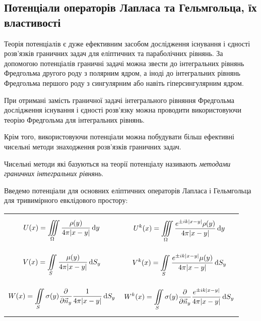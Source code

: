 \subsection{Потенціали операторів Лапласа та Гельмгольца, їх властивості}

Теорія потенціалів є дуже ефективним засобом дослідження існування і єдності розв'язків граничних задач для еліптичних та параболічних рівнянь. За допомогою потенціалів граничні задачі можна звести до інтегральних рівнянь Фредгольма другого роду з полярним ядром, а іноді до інтегральних рівнянь Фредгольма першого роду з сингулярним або навіть гіперсингулярним ядром. \medskip

При отримані замість граничної задачі інтегрального рівняння Фредгольма дослідження існування і єдності розв'язку можна проводити використовуючи теорію Фредгольма для інтегральних рівнянь. \medskip

Крім того, використовуючи потенціали можна побудувати більш ефективні чисельні методи знаходження розв'язків граничних задач.

\begin{definition}
	Чисельні методи які базуються на теорії потенціалу називають \textit{методами граничних інтегральних рівнянь}.
\end{definition}

Введемо потенціали для основних еліптичних операторів Лапласа і Гельмгольца для тривимірного евклідового простору: 
\begin{longtable}{p{} p{}}
	\parbox{.5\textwidth}{\begin{equation}
		\label{eq:4.8.1}
		U(x) = \displaystyle\iiint\limits_\Omega \frac{\rho(y)}{4 \pi |x - y|} \mathop{}\!\mathrm{d} y
	\end{equation}} & \parbox{.5\textwidth}{\begin{equation}
		\label{eq:4.8.1'}
		U^k(x) = \displaystyle\iiint\limits_\Omega \frac{e^{\pm i k |x - y|} \rho(y)}{4 \pi |x - y|} \mathop{}\!\mathrm{d} y
	\end{equation}} \\
	\parbox{.5\textwidth}{\begin{equation}
		\label{eq:4.8.2}
		V(x) = \displaystyle\iint\limits_S \frac{\mu(y)}{4 \pi |x - y|} \mathop{}\!\mathrm{d} S_y
	\end{equation}} & \parbox{.5\textwidth}{\begin{equation}
		\label{eq:4.8.2'}
		V^k(x) = \displaystyle\iint\limits_S \frac{e^{\pm i k |x - y|} \mu(y)}{4 \pi |x - y|} \mathop{}\!\mathrm{d} S_y
	\end{equation}} \\
	\parbox{.5\textwidth}{\begin{equation}
		\label{eq:4.8.3}
		W(x) = \displaystyle\iint\limits_S \sigma(y) \frac{\partial}{\partial \vec n_y} \frac{1}{4 \pi |x - y|} \mathop{}\!\mathrm{d} S_y
	\end{equation}} & \parbox{.5\textwidth}{\begin{equation}
		\label{eq:4.8.3'}
		W^k(x) = \displaystyle\iint\limits_S \sigma(y) \frac{\partial}{\partial \vec n_y} \frac{e^{\pm i k |x - y|}}{4 \pi |x - y|} \mathop{}\!\mathrm{d} S_y
	\end{equation}}
\end{longtable}

